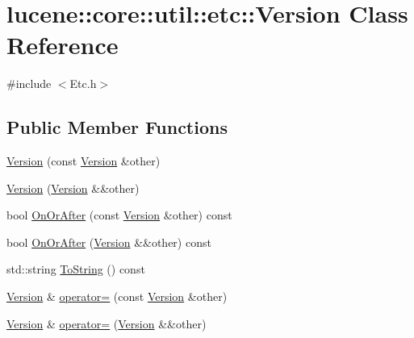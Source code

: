 \hypertarget{classlucene_1_1core_1_1util_1_1etc_1_1Version}{}\section{lucene\+:\+:core\+:\+:util\+:\+:etc\+:\+:Version Class Reference}
\label{classlucene_1_1core_1_1util_1_1etc_1_1Version}


{\ttfamily \#include $<$Etc.\+h$>$}

\subsection*{Public Member Functions}
\begin{DoxyCompactItemize}
\item 
\mbox{\hyperlink{classlucene_1_1core_1_1util_1_1etc_1_1Version_a88c40db992f59dc30c5214a825471d34}{Version}} (const \mbox{\hyperlink{classlucene_1_1core_1_1util_1_1etc_1_1Version}{Version}} \&other)
\item 
\mbox{\hyperlink{classlucene_1_1core_1_1util_1_1etc_1_1Version_a687236c7b78a120c2973e2869f37663c}{Version}} (\mbox{\hyperlink{classlucene_1_1core_1_1util_1_1etc_1_1Version}{Version}} \&\&other)
\item 
bool \mbox{\hyperlink{classlucene_1_1core_1_1util_1_1etc_1_1Version_afa22f8550048b79ea1f64614cac56a61}{On\+Or\+After}} (const \mbox{\hyperlink{classlucene_1_1core_1_1util_1_1etc_1_1Version}{Version}} \&other) const
\item 
bool \mbox{\hyperlink{classlucene_1_1core_1_1util_1_1etc_1_1Version_a651349226b4946c5dee868f60e090ff5}{On\+Or\+After}} (\mbox{\hyperlink{classlucene_1_1core_1_1util_1_1etc_1_1Version}{Version}} \&\&other) const
\item 
std\+::string \mbox{\hyperlink{classlucene_1_1core_1_1util_1_1etc_1_1Version_a2c27700eb00fbfaa157f3615b8f025ba}{To\+String}} () const
\item 
\mbox{\hyperlink{classlucene_1_1core_1_1util_1_1etc_1_1Version}{Version}} \& \mbox{\hyperlink{classlucene_1_1core_1_1util_1_1etc_1_1Version_acadb681698bff09f325e17475cdb10d3}{operator=}} (const \mbox{\hyperlink{classlucene_1_1core_1_1util_1_1etc_1_1Version}{Version}} \&other)
\item 
\mbox{\hyperlink{classlucene_1_1core_1_1util_1_1etc_1_1Version}{Version}} \& \mbox{\hyperlink{classlucene_1_1core_1_1util_1_1etc_1_1Version_a80e6e12eb42ef093474810a0289b6eb2}{operator=}} (\mbox{\hyperlink{classlucene_1_1core_1_1util_1_1etc_1_1Version}{Version}} \&\&other)

\end{DoxyCompactItemize}
